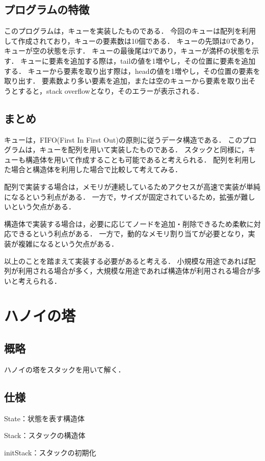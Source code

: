 \documentclass{ltjsarticle}
\begin{document}
\subsection{プログラムの特徴}
このプログラムは，キューを実装したものである．
今回のキューは配列を利用して作成されており，キューの要素数は10個である．
キューの先頭は0であり，キューが空の状態を示す．
キューの最後尾は9であり，キューが満杯の状態を示す．
キューに要素を追加する際は，tailの値を1増やし，その位置に要素を追加する．
キューから要素を取り出す際は，headの値を1増やし，その位置の要素を取り出す．
要素数より多い要素を追加，または空のキューから要素を取り出そうとすると，stack overflowとなり，そのエラーが表示される．

\subsection{まとめ}
キューは，FIFO(First In First Out)の原則に従うデータ構造である．
このプログラムは，キューを配列を用いて実装したものである．
スタックと同様に，キューも構造体を用いて作成することも可能であると考えられる．
配列を利用した場合と構造体を利用した場合で比較して考えてみる．

配列で実装する場合は，メモリが連続しているためアクセスが高速で実装が単純になるという利点がある．
一方で，サイズが固定されているため，拡張が難しいという欠点がある．

構造体で実装する場合は，必要に応じてノードを追加・削除できるため柔軟に対応できるという利点がある．
一方で，動的なメモリ割り当てが必要となり，実装が複雑になるという欠点がある．

以上のことを踏まえて実装する必要があると考える．
小規模な用途であれば配列が利用される場合が多く，大規模な用途であれば構造体が利用される場合が多いと考えられる．

\section{ハノイの塔}
\subsection{概略}
ハノイの塔をスタックを用いて解く．

\subsection{仕様}
\noindent State：状態を表す構造体

\noindent Stack：スタックの構造体

\noindent initStack：スタックの初期化
\end{document}
